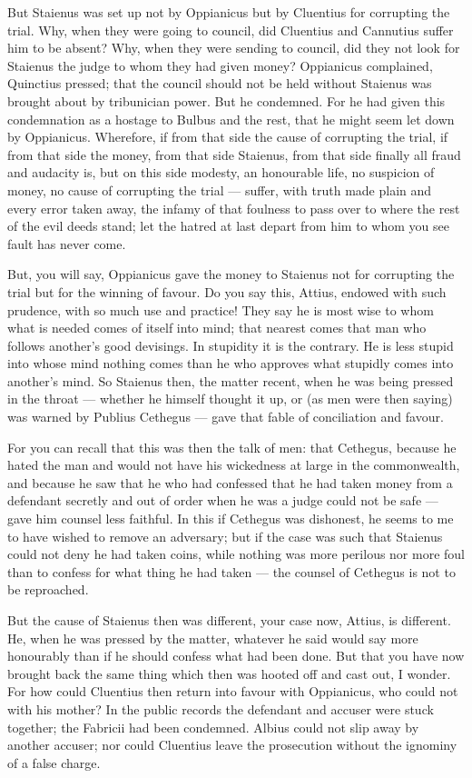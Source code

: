  But Staienus was set up not by Oppianicus but by Cluentius for corrupting the trial. Why, when they were going to council, did Cluentius and Cannutius suffer him to be absent? Why, when they were sending to council, did they not look for Staienus the judge to whom they had given money? Oppianicus complained, Quinctius pressed; that the council should not be held without Staienus was brought about by tribunician power. But he condemned. For he had given this condemnation as a hostage to Bulbus and the rest, that he might seem let down by Oppianicus. Wherefore, if from that side the cause of corrupting the trial, if from that side the money, from that side Staienus, from that side finally all fraud and audacity is, but on this side modesty, an honourable life, no suspicion of money, no cause of corrupting the trial --- suffer, with truth made plain and every error taken away, the infamy of that foulness to pass over to where the rest of the evil deeds stand; let the hatred at last depart from him to whom you see fault has never come.

 But, you will say, Oppianicus gave the money to Staienus not for corrupting the trial but for the winning of favour. Do you say this, Attius, endowed with such prudence, with so much use and practice! They say he is most wise to whom what is needed comes of itself into mind; that nearest comes that man who follows another's good devisings. In stupidity it is the contrary. He is less stupid into whose mind nothing comes than he who approves what stupidly comes into another's mind. So Staienus then, the matter recent, when he was being pressed in the throat --- whether he himself thought it up, or (as men were then saying) was warned by Publius Cethegus --- gave that fable of conciliation and favour.

 For you can recall that this was then the talk of men: that Cethegus, because he hated the man and would not have his wickedness at large in the commonwealth, and because he saw that he who had confessed that he had taken money from a defendant secretly and out of order when he was a judge could not be safe --- gave him counsel less faithful. In this if Cethegus was dishonest, he seems to me to have wished to remove an adversary; but if the case was such that Staienus could not deny he had taken coins, while nothing was more perilous nor more foul than to confess for what thing he had taken --- the counsel of Cethegus is not to be reproached.

 But the cause of Staienus then was different, your case now, Attius, is different. He, when he was pressed by the matter, whatever he said would say more honourably than if he should confess what had been done. But that you have now brought back the same thing which then was hooted off and cast out, I wonder. For how could Cluentius then return into favour with Oppianicus, who could not with his mother? In the public records the defendant and accuser were stuck together; the Fabricii had been condemned. Albius could not slip away by another accuser; nor could Cluentius leave the prosecution without the ignominy of a false charge.

